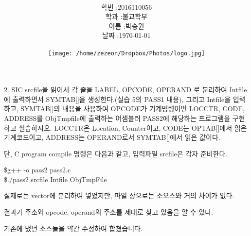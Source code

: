 \documentclass[12pt,a4paper]{article}
\title{
	\centering
	\pgfornament[width=12cm,color=teal]{84}\\
	\vspace{1cm}
	\fontsize{50}{50} \selectfont {시스템 S/W 실습6\\선택 과제}\\
	\pgfornament[width=12cm,color=teal]{88}\\
	\vfill}
\author{
	\LARGE
	\begin{tabular}{rl}
		\hline
		학번 : & 2016110056\\ 
		학과 : & 불교학부 \\
		이름 : & 박승원\\
		날짜 : & \today\\
		\hline
	\end{tabular}\vspace{2cm}
	\\
	\texttt{[image: /home/zezeon/Dropbox/Photos/logo.jpg]}
}
\date{}
\begin{document}
\maketitle
\newpage
\noindent
\lstset{columns=flexible, tabsize=4, frame=single, showstringspaces=false, breaklines=true, upquote=true}

\lstset{language=C++}
2. SIC srcfile을 읽어서 각 줄을 LABEL, OPCODE, OPERAND 로 분리하여 Intfile에 출력하면서 SYMTAB[]을 생성한다.(실습 5의 PASS1 내용), 
그리고 Intfile을 입력하고, SYMTAB[]의 내용을 사용하여 OPCODE가 기계명령이면 {LOCCTR, CODE, ADDRESS}를 ObjTmpfile에 출력하는 어셈블러 PASS2에 해당하는 프로그램을 구현하고 실습하시오.
LOCCTR은 Location, Counter이고, CODE는 OPTAB[]에서 읽은 기계코드이고, ADDRESS는 OPERAND로서 SYMTAB[]에서 읽은 값이다.

\vspace{1cm}
단, C program compile 명령은 다음과 같고, 입력파일 srcfile은 각자 준비한다.

\$g++ -o pass2 pass2.c\\

\$./pass2 srcfile Intfile ObjTmpFile




실제로는 vector에 분리하여 넣었지만, 파일 상으로는 소오스와 거의 차이가 없다.


결과가 주소와 opcode, operand의 주소를 제대로 찾고 있음을 알 수 있다.

{}
\indent
기존에 냈던 소스들을 약간 수정하여 합쳤습니다. 
\end{document}
